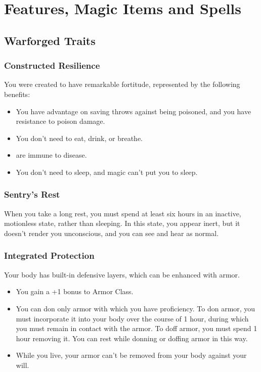 \documentclass[letterpaper,openany,oneside,twocolumn]{book}
\begin{document}
\onecolumn


\rendercharactersheet

\renderbackgroundsheet

\renderspellsheet

\restoregeometry
\twocolumn

\chapter*{Features, Magic Items and Spells}

\section*{Warforged Traits}
\subsection*{Constructed Resilience}
You were created to have remarkable fortitude, represented by the following benefits:
\begin{itemize}
	\item You have advantage on saving throws against being poisoned, and you have resistance to poison damage.
	\item You don't need to eat, drink, or breathe.
	\item  are immune to disease.
	\item You don't need to sleep, and magic can't put you to sleep.
\end{itemize}
\subsection*{Sentry's Rest}
When you take a long rest, you must spend at least six hours in an inactive, motionless state, rather than sleeping. In this state, you appear inert, but it doesn't render you unconscious, and you can see and hear as normal.
\subsection*{Integrated Protection}
Your body has built-in defensive layers, which can be enhanced with armor.
\begin{itemize}
	\item You gain a +1 bonus to Armor Class.
	\item You can don only armor with which you have proficiency. To don armor, you must incorporate it into your body over the course of 1 hour, during which you must remain in contact with the armor. To doff armor, you must spend 1 hour removing it. You can rest while donning or doffing armor in this way.
	\item While you live, your armor can't be removed from your body against your will.
\end{itemize}
\end{document}
